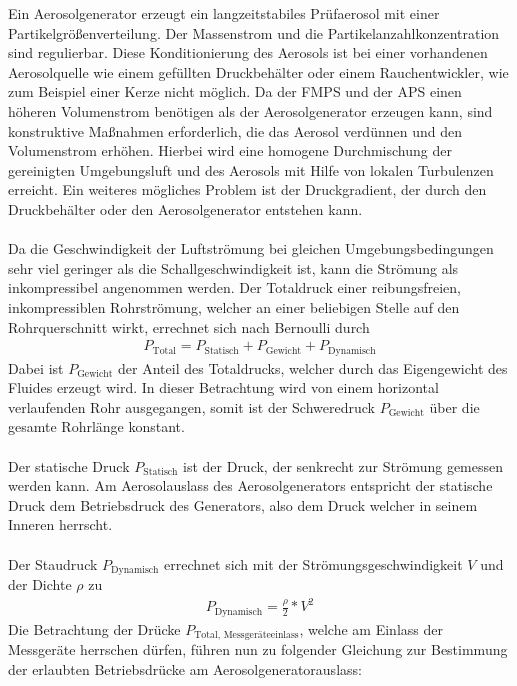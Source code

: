 Ein Aerosolgenerator erzeugt ein langzeitstabiles Pr\"{u}faerosol mit einer Partikelgr\"{o}{\ss}enverteilung\cite{candle}. Der Massenstrom und die Partikelanzahlkonzentration sind regulierbar. Diese Konditionierung des Aerosols ist bei einer vorhandenen Aerosolquelle wie einem gef\"{u}llten Druckbeh\"{a}lter oder einem Rauchentwickler, wie zum Beispiel einer Kerze nicht m\"{o}glich. Da der FMPS und der APS einen h\"{o}heren Volumenstrom ben\"{o}tigen als der Aerosolgenerator erzeugen kann, sind konstruktive Ma{\ss}nahmen erforderlich, die das Aerosol verd\"{u}nnen und den Volumenstrom erh\"{o}hen. Hierbei wird eine homogene Durchmischung der gereinigten Umgebungsluft und des Aerosols mit Hilfe von lokalen Turbulenzen erreicht. Ein weiteres m\"{o}gliches Problem ist der Druckgradient, der durch den Druckbeh\"{a}lter oder den Aerosolgenerator entstehen kann.
\\\\
Da die Geschwindigkeit der Luftstr\"{o}mung bei gleichen Umgebungsbedingungen sehr viel geringer als die Schallgeschwindigkeit ist, kann die Str\"{o}mung als inkompressibel angenommen werden. Der Totaldruck einer reibungsfreien, inkompressiblen Rohrstr\"{o}mung, welcher an einer beliebigen Stelle auf den Rohrquerschnitt wirkt, errechnet sich nach Bernoulli durch
\begin{align*}
	P_\text{Total} = P_\text{Statisch} + P_\text{Gewicht} + P_\text{Dynamisch}
\end{align*}
Dabei ist \(P_\text{Gewicht}\) der Anteil des Totaldrucks, welcher durch das Eigengewicht des Fluides erzeugt wird. In dieser Betrachtung wird von einem horizontal verlaufenden Rohr ausgegangen, somit ist der Schweredruck \(P_\text{Gewicht}\) \"{u}ber die gesamte Rohrl\"{a}nge konstant.
\\\\
Der statische Druck \(P_\text{Statisch}\) ist der Druck, der senkrecht zur Str\"{o}mung gemessen werden kann. Am Aerosolauslass des Aerosolgenerators entspricht der statische Druck dem Betriebsdruck des Generators, also dem Druck welcher in seinem Inneren herrscht.
\\\\
Der Staudruck \(P_\text{Dynamisch}\) errechnet sich mit der Str\"{o}mungsgeschwindigkeit \(V\) und der Dichte \(\rho\) zu
\begin{align*}
	P_\text{Dynamisch} = \frac{\rho}{2} * V^2
\end{align*}
Die Betrachtung der Dr\"{u}cke \(P_\text{Total, Messger\"{a}teeinlass}\), welche am Einlass der Messger\"{a}te herrschen d\"{u}rfen, f\"{u}hren nun zu folgender Gleichung zur Bestimmung der erlaubten Betriebsdr\"{u}cke am Aerosolgeneratorauslass:
